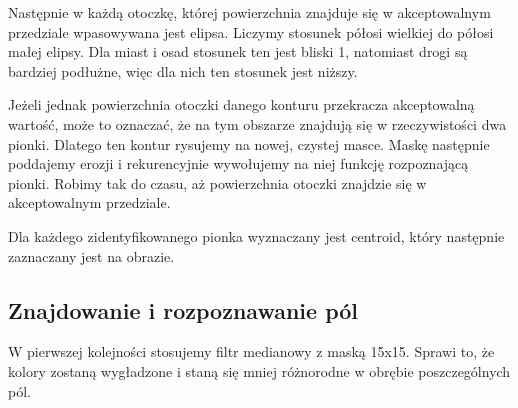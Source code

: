 \documentclass[a4paper]{article}
\begin{document}
    Następnie w każdą otoczkę, której powierzchnia znajduje się w akceptowalnym przedziale wpasowywana jest elipsa.
    Liczymy stosunek półosi wielkiej do półosi małej elipsy. Dla miast i osad stosunek ten jest bliski 1, natomiast drogi są bardziej podłużne, więc dla nich ten stosunek jest niższy.

    Jeżeli jednak powierzchnia otoczki danego konturu przekracza akceptowalną wartość, może to oznaczać, że na tym obszarze znajdują się w rzeczywistości dwa pionki. Dlatego ten kontur rysujemy na nowej, czystej masce. Maskę następnie poddajemy erozji i rekurencyjnie wywołujemy na niej funkcję rozpoznającą pionki. Robimy tak do czasu, aż powierzchnia otoczki znajdzie się w akceptowalnym przedziale.

    Dla każdego zidentyfikowanego pionka wyznaczany jest centroid, który następnie zaznaczany jest na obrazie.

    \subsection{Znajdowanie i rozpoznawanie pól}
    W pierwszej kolejności stosujemy filtr medianowy z maską 15x15. Sprawi to, że kolory zostaną wygładzone i staną się mniej różnorodne w obrębie poszczególnych pól.
    
\end{document}
